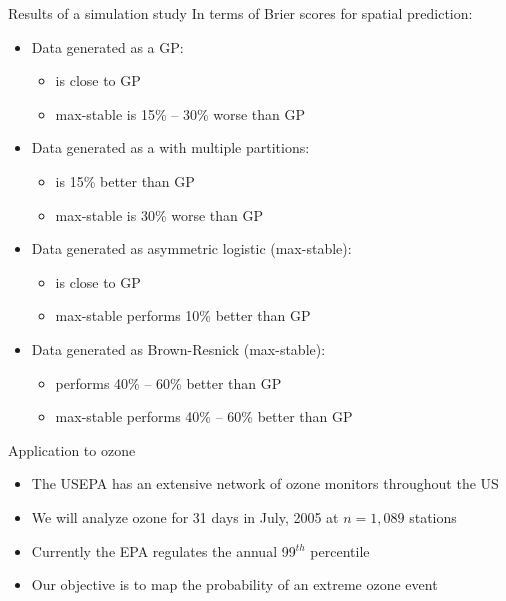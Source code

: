 \documentclass{beamer}
\begin{document}
\begin{frame}{Results of a simulation study}
In terms of Brier scores for spatial prediction:\vspace{1em}
\begin{itemize}\setlength\itemsep{1em}
	\item Data generated as a GP:
	\begin{itemize}
	 	\item \skewt{} is close to GP
	 	\item max-stable is 15\% -- 30\% worse than GP
	\end{itemize}
	\item Data generated as a \skewt{} with multiple partitions:
	\begin{itemize}
		\item \skewt{} is 15\% better than GP
	 	\item max-stable is 30\% worse than GP
	\end{itemize}
	\item Data generated as asymmetric logistic (max-stable):
	\begin{itemize}
		\item \skewt{} is close to GP
		\item max-stable performs 10\% better than GP
	\end{itemize}
 	\item Data generated as Brown-Resnick (max-stable):
 	\begin{itemize}
		\item \skewt{} performs 40\% -- 60\% better than GP
 		\item max-stable performs 40\% -- 60\% better than GP
 	\end{itemize}
\end{itemize}
\end{frame}


 \begin{frame}{Application to ozone}
 	\begin{itemize}\setlength\itemsep{1em}
 	\item The USEPA has an extensive network of ozone monitors throughout the US
 	\item We will analyze ozone for 31 days in July, 2005 at $n=1,089$ stations
 	\item Currently the EPA regulates the annual 99$^{th}$ percentile
 	\item Our objective is to map the probability of an extreme ozone event
 	\end{itemize}
 \end{frame}
\end{document}
